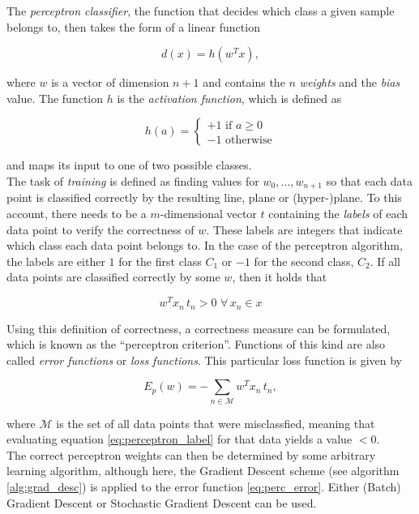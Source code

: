 The \textit{perceptron classifier}, the function that decides which class a given sample belongs to, then takes the form of a linear function

\[ d(x) = h(w^{T}x), \label{eq:perc_class} \]

\noindent where $w$ is a vector of dimension $n+1$ and contains the $n$ \textit{weights} and the \textit{bias} value. The function $h$ is the \textit{activation function}, which is defined as 

\[ h(a) =  \begin{cases}
		+1 \text{ if } a \geq 0 \\
	   	 -1 \text{ otherwise}
	    \end{cases}\]

\noindent and maps its input to one of two possible classes.\\

\noindent The task of \textit{training} is defined as finding values for $w_0, \dots, w_{n+1}$ so that each data point is classified correctly by the resulting line, plane or (hyper-)plane. To this account, there needs to be a $m$-dimensional vector $t$ containing the \textit{labels} of each data point to verify the correctness of $w$. These labels are integers that indicate which class each data point belongs to. In the case of the perceptron algorithm, the labels are either $1$ for the first class $C_1$ or $-1$ for the second class, $C_2$. If all data points are classified correctly by some $w$, then it holds that

\[ w^T x_n \, t_n > 0 \,\,\forall\, x_n \in x \label{eq:perceptron_label} \]

\noindent Using this definition of correctness, a correctness measure can be formulated, which is known as the ``perceptron criterion''. Functions of this kind are also called \textit{error functions} or \textit{loss functions}. This particular loss function is given by

\[ E_p(w) = - \sum \limits_{n \in \mathcal{M}} w^T x_n\, t_n, \label{eq:perc_error}\]

\noindent where $\mathcal{M}$ is the set of all data points that were misclassfied, meaning that evaluating equation \ref{eq:perceptron_label} for that data yields a value $< 0$. \cite[pp. 192--194]{bishop_pattern}\\

\noindent The correct perceptron weights can then be determined by some arbitrary learning algorithm, although here, the Gradient Descent scheme (see algorithm \ref{alg:grad_desc}) is applied to the error function \ref{eq:perc_error}. Either (Batch) Gradient Descent or Stochastic Gradient Descent can be used.


